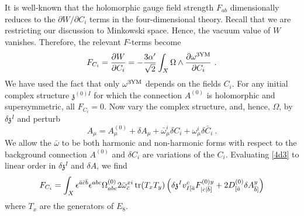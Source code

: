\documentclass[12pt]{article}
\numberwithin{equation}{section}
\begin{document}
It is well-known that the holomorphic gauge field strength $F_{ab}$
dimensionally reduces to the $\partial W / \partial C_i$ terms in
the four-dimensional theory. Recall that we are restricting our
discussion to Minkowski space. 
Hence, the vacuum value of $W$
vanishes. Therefore, the relevant $F$-terms become
%
\begin{equation}
F_{C_i}=\frac{\partial W}{\partial C_i} =-\frac{3 \alpha'}{\sqrt{2}} \int_X \Omega \wedge \frac{\partial
 \omega^{3 \textnormal{YM}}}{\partial {C_i}} \ .
\label{4d3}
\end{equation}
%
We have used the fact that only $\omega^{3 \textnormal{YM}}$ depends on the fields $C_i$. For any initial complex structure ${\mathfrak{z}}^{(0)I}$ for which the connection $A^{(0)}$ is holomorphic and supersymmetric, all 
$F_{C_i}=0$. Now vary the complex structure, and, hence, $\Omega$, by $\delta {\mathfrak{z}}^{I}$ and perturb
%
\begin{equation}
A_{\mu} = A^{(0)}_{\mu} + \delta A_{\mu}+\bar{\omega}^{i}_{\mu}
\delta C_{i} + \omega^{i}_{\mu}\delta{ \bar{C}}_{i} \ .
\label{4d4}
\end{equation}
%
We allow the $\bar{\omega}$ to be both harmonic  and non-harmonic forms with respect to the
background connection $A^{(0)}$ and $\delta C_{i}$ are variations of
the $C_i$.  Evaluating \eqref{4d3} to linear order in
$\delta {\mathfrak{z}}^{I}$ and $\delta A$, we find
%
\begin{equation}
F_{C_i} = \int_X \epsilon^{\bar{a}\bar{c}\bar{b}}
\epsilon^{abc} \Omega^{(0)}_{abc} 2 \bar{\omega}^{x i}_{\bar{c}} \,
\textnormal{tr}(T_{x}T_{y})\left( \delta {\mathfrak{z}}^{I} v_{I [{\bar{a}}}^{c}F_{|c|{\bar{b}}]}^{(0)y} + 2D^{(0)}_{[{\bar{a}}} \delta A^{y}_{{\bar{b}}]} \right) 
\label{4d5}
\end{equation}
%
where $T_{x}$ are the generators of $E_{8}$.
\end{document}

